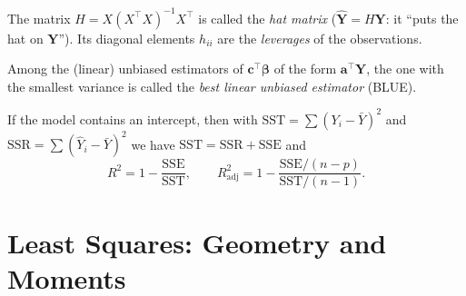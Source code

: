 \documentclass[main.tex]{subfiles}
\begin{document}
\begin{definition}
The matrix $H=X(X^\top X)^{-1}X^\top$ is called the \emph{hat matrix} ($\hat{\mathbf Y}=H\mathbf Y$: it ``puts the hat on $\mathbf Y$''). Its diagonal elements $h_{ii}$ are the \emph{leverages} of the observations.
\end{definition}

\begin{definition}
Among the (linear) unbiased estimators of $\mathbf c^\top\bm\beta$ of the form $\mathbf a^\top\mathbf Y$, the one with the smallest variance is called the \emph{best linear unbiased estimator} (BLUE).
\end{definition}

\begin{definition}
If the model contains an intercept, then with $\mathrm{SST}=\sum(Y_i-\bar Y)^2$ and $\mathrm{SSR}=\sum(\hat Y_i-\bar Y)^2$ we have $\mathrm{SST}=\mathrm{SSR}+\mathrm{SSE}$ and
\[
R^2=1-\frac{\mathrm{SSE}}{\mathrm{SST}},\qquad R^2_{\text{adj}}=1-\frac{\mathrm{SSE}/(n-p)}{\mathrm{SST}/(n-1)} .
\]
\end{definition}

\section{Least Squares: Geometry and Moments}
\end{document}
